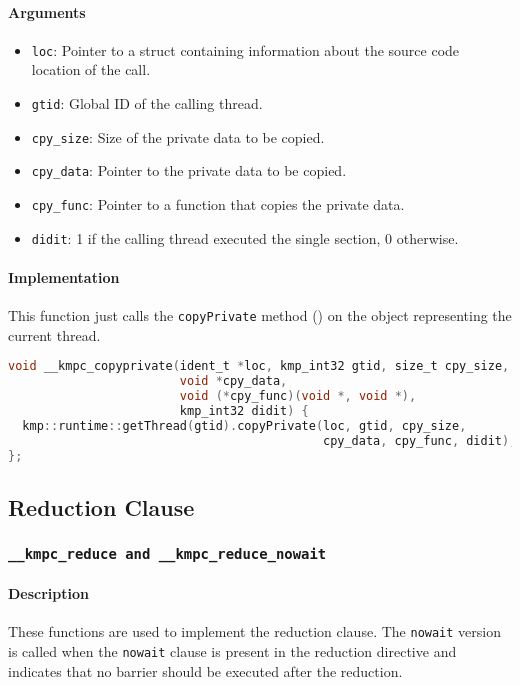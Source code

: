 \paragraph{Arguments}
\begin{itemize}
	\item \texttt{loc}: Pointer to a struct containing information about the source code location
	      of the call.
	\item \texttt{gtid}: Global ID of the calling thread.
	\item \texttt{cpy\_size}: Size of the private data to be copied.
	\item \texttt{cpy\_data}: Pointer to the private data to be copied.
	\item \texttt{cpy\_func}: Pointer to a function that copies the private data.
	\item \texttt{didit}: 1 if the calling thread executed the single section, 0 otherwise.
\end{itemize}

\paragraph{Implementation} This function just calls the \texttt{copyPrivate} method () on
the object representing the current thread.

\begin{lstlisting}[language=C, caption={__kmpc_copyprivate},
                   label={lst:kmpc-copyprivate}, escapechar=@]
void __kmpc_copyprivate(ident_t *loc, kmp_int32 gtid, size_t cpy_size,
                        void *cpy_data,
                        void (*cpy_func)(void *, void *),
                        kmp_int32 didit) {
  kmp::runtime::getThread(gtid).copyPrivate(loc, gtid, cpy_size,
                                            cpy_data, cpy_func, didit);
};
\end{lstlisting}

\subsection{Reduction Clause}

\subsubsection{\texttt{__kmpc_reduce and __kmpc_reduce_nowait}}

\paragraph{Description} These functions are used to implement the reduction clause. The
\texttt{nowait} version is called when the \texttt{nowait} clause is present in the reduction
directive and indicates that no barrier should be executed after the reduction.


